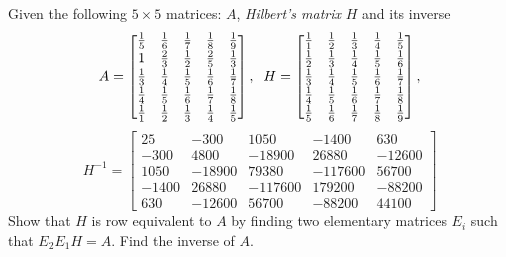 
\begin{Exercise}[
name={},
title={}, 
difficulty=0,
origin={\cite{YL}}]
Given the following $5\times 5$ matrices: $A$, \emph{Hilbert's matrix} $H$ and its inverse
\[
A=
\begin{bmatrix}
\frac{1}{5} & \frac{1}{6} & \frac{1}{7} & \frac{1}{8} & \frac{1}{9}\vspace{0.1em}\\
1 & \frac{2}{3} & \frac{1}{2} & \frac{2}{5} & \frac{1}{3} \vspace{0.1em}\\
\frac{1}{3} & \frac{1}{4} & \frac{1}{5} & \frac{1}{6} & \frac{1}{7} \vspace{0.1em}\\
\frac{1}{4} & \frac{1}{5} & \frac{1}{6} & \frac{1}{7} & \frac{1}{8} \vspace{0.1em}\\
\frac{1}{1} & \frac{1}{2} & \frac{1}{3} & \frac{1}{4} & \frac{1}{5} 
\end{bmatrix},\;\;
H=
\begin{bmatrix}
  \frac{1}{1} & \frac{1}{2} & \frac{1}{3} & \frac{1}{4} & \frac{1}{5} \vspace{0.1em}\\
  \frac{1}{2} & \frac{1}{3} & \frac{1}{4} & \frac{1}{5} & \frac{1}{6} \vspace{0.1em}\\
  \frac{1}{3} & \frac{1}{4} & \frac{1}{5} & \frac{1}{6} & \frac{1}{7} \vspace{0.1em}\\
  \frac{1}{4} & \frac{1}{5} & \frac{1}{6} & \frac{1}{7} & \frac{1}{8} \vspace{0.1em}\\
  \frac{1}{5} & \frac{1}{6} & \frac{1}{7} & \frac{1}{8} & \frac{1}{9}
\end{bmatrix},\]
\[
H^{-1}=
\begin{bmatrix}
         25    &    -300    &    1050    &   -1400    &     630  \\
        -300   &     4800   &   -18900   &    26880   &   -12600 \\
        1050   &   -18900   &    79380   &  -117600   &    56700 \\
       -1400   &    26880   &  -117600   &   179200   &   -88200 \\
         630   &   -12600   &    56700   &   -88200   &    44100 
\end{bmatrix}\]
\Question Show that $H$ is row equivalent to $A$ by finding two elementary matrices $E_i$ such that $E_2E_1H=A$.
\Question Find the inverse of $A$.
\end{Exercise}

